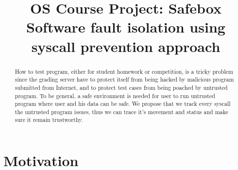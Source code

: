 \documentclass[conference,compsoc]{IEEEtran}
\begin{document}
\title{
	OS Course Project: Safebox\\ 
	Software fault isolation using syscall prevention approach
}


\author{
\and
}

\maketitle

\begin{abstract}
	How to test program, either for student homework or competition, is a tricky problem since the grading server have to protect itself from being hacked by malicious program submitted from Internet, and to protect test cases from being poached by untrusted program. 
	To be general, a safe environment is needed for user to run untrusted program where user and his data can be safe. 
	We propose that we track every syscall the untrusted program issues, thus we can trace it's movement and status and make sure it remain trustworthy. 
\end{abstract}

\section{Motivation}
\end{document}
